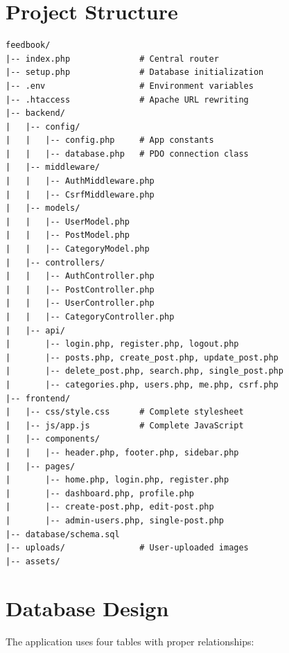 \documentclass[12pt,a4paper]{report}
\begin{document}
\section{Project Structure}
\begin{lstlisting}[language={},numbers=none,basicstyle=\ttfamily\small]
feedbook/
|-- index.php              # Central router
|-- setup.php              # Database initialization
|-- .env                   # Environment variables
|-- .htaccess              # Apache URL rewriting
|-- backend/
|   |-- config/
|   |   |-- config.php     # App constants
|   |   |-- database.php   # PDO connection class
|   |-- middleware/
|   |   |-- AuthMiddleware.php
|   |   |-- CsrfMiddleware.php
|   |-- models/
|   |   |-- UserModel.php
|   |   |-- PostModel.php
|   |   |-- CategoryModel.php
|   |-- controllers/
|   |   |-- AuthController.php
|   |   |-- PostController.php
|   |   |-- UserController.php
|   |   |-- CategoryController.php
|   |-- api/
|       |-- login.php, register.php, logout.php
|       |-- posts.php, create_post.php, update_post.php
|       |-- delete_post.php, search.php, single_post.php
|       |-- categories.php, users.php, me.php, csrf.php
|-- frontend/
|   |-- css/style.css      # Complete stylesheet
|   |-- js/app.js          # Complete JavaScript
|   |-- components/
|   |   |-- header.php, footer.php, sidebar.php
|   |-- pages/
|       |-- home.php, login.php, register.php
|       |-- dashboard.php, profile.php
|       |-- create-post.php, edit-post.php
|       |-- admin-users.php, single-post.php
|-- database/schema.sql
|-- uploads/               # User-uploaded images
|-- assets/
\end{lstlisting}

\section{Database Design}

The application uses four tables with proper relationships:
\end{document}
